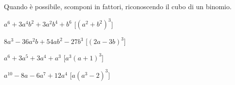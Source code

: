 \begin{esercizio}[\Ast]
\label{ese:16.26}
Quando è possibile, scomponi in fattori, riconoscendo il cubo di un binomio.
\begin{multicols}{2}
\begin{enumeratea}
 \item $a^{6}+3a^{4}b^{2}+3a^{2}b^{4}+b^{6}$ 
  \hfill [$\left(a^{2}+b^{2}\right)^{3}$]
 \item $8a^{3}-36a^{2}b+54ab^{2}-27b^{3}$ \hfill [$(2a-3b)^{3}$]
 \item $a^{6}+3a^{5}+3a^{4}+a^{3}$ \hfill [$a^{3}(a+1)^{3}$]
 \item $a^{10}-8a-6a^{7}+12a^{4}$ 
  \hfill [$a\left(a^3-2\right)^3$]
\end{enumeratea}
\end{multicols}
\end{esercizio}

% 


